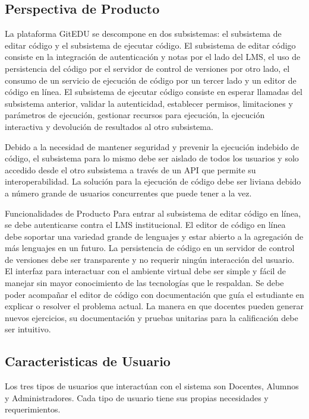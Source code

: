\subsection{Perspectiva de Producto}
La plataforma GitEDU se descompone en dos subsistemas: el subsistema de editar código y el subsistema de ejecutar código. El subsistema de editar código consiste en la integración de autenticación y notas por el lado del LMS, el uso de persistencia del código por el servidor de control de versiones por otro lado, el consumo de un servicio de ejecución de código por un tercer lado y un editor de código en línea. El subsistema de ejecutar código consiste en esperar llamadas del subsistema anterior, validar la autenticidad, establecer permisos, limitaciones y parámetros de ejecución, gestionar recursos para ejecución, la ejecución interactiva y devolución de resultados al otro subsistema.

Debido a la necesidad de mantener seguridad y prevenir la ejecución indebido de código, el subsistema para lo mismo debe ser aislado de todos los usuarios y solo accedido desde el otro subsistema a través de un API que permite su interoperabilidad. La solución para la ejecución de código debe ser liviana debido a número grande de usuarios concurrentes que puede tener a la vez.

Funcionalidades de Producto
Para entrar al subsistema de editar código en línea, se debe autenticarse contra el LMS institucional. El editor de código en línea debe soportar una variedad grande de lenguajes y estar abierto a la agregación de más lenguajes en un futuro. La persistencia de código en un servidor de control de versiones debe ser transparente y no requerir ningún interacción del usuario. El interfaz para interactuar con el ambiente virtual debe ser simple y fácil de manejar sin mayor conocimiento de las tecnologías que le respaldan. Se debe poder acompañar el editor de código con documentación que guía el estudiante en explicar o resolver el problema actual. La manera en que docentes pueden generar nuevos ejercicios, su documentación y pruebas unitarias para la calificación debe ser intuitivo.

\subsection{Caracteristicas de Usuario}
Los tres tipos de usuarios que interactúan con el sistema son Docentes, Alumnos y Administradores. Cada tipo de usuario tiene sus propias necesidades y requerimientos.

